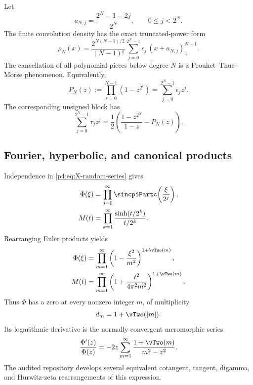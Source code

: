 \documentclass[11pt,oneside]{article}
\theoremstyle{definition}
\begin{document}
Let
\[
 a_{N,j}=\frac{2^N-1-2j}{2^N},\qquad 0\le j<2^N.
\]
The finite convolution density has the exact truncated-power form
\begin{equation}
 \rho_N(x)=\frac{2^{N(N-1)/2}}{(N-1)!}
 \sum_{j=0}^{2^N-1}\epsilon_j\,(x+a_{N,j})_+^{N-1}.
 \label{p4:eq:finite-spline}
\end{equation}
The cancellation of all polynomial pieces below degree \(N\) is a Prouhet--Thue--Morse
phenomenon. Equivalently,
\begin{equation}
 P_N(z):=\prod_{r=0}^{N-1}(1-z^{2^r})
 =\sum_{j=0}^{2^N-1}\epsilon_j z^j.
 \label{p4:eq:finite-TM-product}
\end{equation}
The corresponding unsigned block has
\begin{equation}
 \sum_{j=0}^{2^N-1}\tau_j z^j
 =\frac12\left(\frac{1-z^{2^N}}{1-z}-P_N(z)\right).
 \label{p4:eq:unsigned-finite-product}
\end{equation}

\subsection{Fourier, hyperbolic, and canonical products}

Independence in \eqref{p4:eq:X-random-series} gives
\begin{align}
 \Phi(\xi)
 &=\prod_{j=0}^{\infty}\sincpiPartc\!\left(\frac{\xi}{2^j}\right),
 \label{p4:eq:phi-sinc-product}\\
 M(t)
 &=\prod_{k=1}^{\infty}\frac{\sinh(t/2^k)}{t/2^k}.
 \label{p4:eq:M-hyperbolic-product}
\end{align}
Rearranging Euler products yields
\begin{align}
 \Phi(\xi)
 &=\prod_{m=1}^{\infty}
 \left(1-\frac{\xi^2}{m^2}\right)^{1+\vTwo(m)},
 \label{p4:eq:phi-canonical-product}\\
 M(t)
 &=\prod_{m=1}^{\infty}
 \left(1+\frac{t^2}{4\pi^2m^2}\right)^{1+\vTwo(m)}.
 \label{p4:eq:M-canonical-product}
\end{align}
Thus \(\Phi\) has a zero at every nonzero integer \(m\), of multiplicity
\begin{equation}
 d_m=1+\vTwo(|m|).
 \label{p4:eq:zero-multiplicity}
\end{equation}
Its logarithmic derivative is the normally convergent meromorphic series
\begin{equation}
 \frac{\Phi'(z)}{\Phi(z)}
 =-2z\sum_{m=1}^{\infty}\frac{1+\vTwo(m)}{m^2-z^2}.
 \label{p4:eq:phi-log-derivative}
\end{equation}
The audited repository develops several equivalent cotangent, tangent, digamma, and
Hurwitz-zeta rearrangements of this expression.
\end{document}
